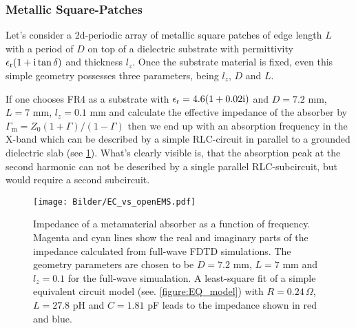 \subsubsection{Metallic Square-Patches}
Let's consider a 2d-periodic array of metallic square patches of edge length $L$ with a period of $D$ on top of a dielectric substrate with permittivity $\epsilon_\mathrm{r}(1+\mathrm{i} \tan\delta)$ and thickness $l_z$. Once the substrate material is fixed, even this simple geometry possesses three parameters, being $l_z$, $D$ and $L$. 

If one chooses FR4 as a substrate with $\epsilon_\mathrm{r}= 4.6(1+0.02\mathrm{i})$ and $D=7.2$ mm, $L=7$ mm, $l_z=0.1$ mm and calculate the effective impedance of the absorber by $\Gamma_\mathrm{m} = Z_0 (1+\Gamma)/(1-\Gamma)$ then we end up with an absorption frequency in the X-band which can be described by a simple RLC-circuit in parallel to a grounded dielectric slab (see \cref{fig:Impedance}). What's clearly visible is, that the absorption peak at the second harmonic can not be described by a single parallel RLC-subcircuit, but would require a second subcircuit.

\begin{figure}
\centering
\texttt{[image: Bilder/EC\_vs\_openEMS.pdf]}
\caption{Impedance of a metamaterial absorber as a function of frequency. Magenta and cyan lines show the real and imaginary parts of the impedance calculated from full-wave FDTD simulations. The geometry parameters are chosen to be $D=7.2$ mm, $L=7$ mm and $l_z=0.1$ for the full-wave simualation. A least-square fit of a simple equivalent circuit model (see. \cref{figure:EQ_model}) with $R=0.24\,\Omega$, $L= 27.8$ pH and $C=1.81$ pF leads to the impedance shown in red and blue.}
\label{fig:Impedance}
\end{figure}

